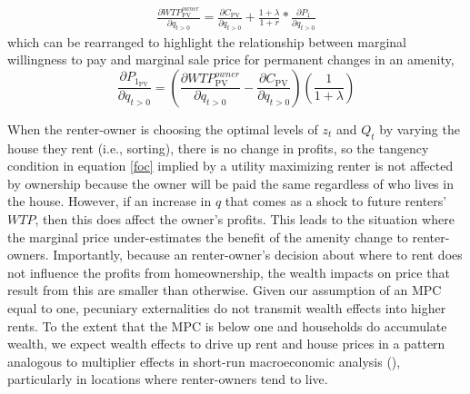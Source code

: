 \documentclass[ecta,nameyear,draft]{econsocart}
\theoremstyle{plain}
\theoremstyle{remark}
\begin{document}
\begin{eqnarray*}
	\frac{\partial \mathit{WTP}^{\mathit{owner}}_{\mathrm{PV}}}{\partial q_{t>0}} =	\frac{\partial C_{\mathrm{PV}}}{\partial q_{t>0}}+\frac{1+\lambda}{1+r}*\frac{\partial P_1}{\partial q_{t>0}}
\end{eqnarray*}
which can be rearranged to highlight the relationship between marginal willingness to pay and marginal sale price for permanent changes in an amenity,
\begin{equation*}
	\frac{\partial P_{1_{\mathrm{PV}}}} {\partial q_{t>0}}=\left(
	\frac{\partial \mathit{WTP}^{\mathit{owner}}_{\mathrm{PV}}}{\partial q_{t>0}}-\frac{\partial C_{\mathrm{PV}}}{\partial q_{t>0}}\right)\left(\frac{1}{1+\lambda}\right)
\end{equation*}


When the renter-owner is choosing the optimal levels of $z_t$ and $Q_t$ by varying the house they rent (i.e., sorting), there is no change in profits, so the tangency condition in equation \ref{foc} implied by a utility maximizing renter is not affected by ownership because the owner will be paid the same regardless of who lives in the house. However, if an increase in $q$ that comes as a shock to future renters' $WTP$, then this does affect the owner's profits. This leads to the situation where the marginal price under-estimates the benefit of the amenity change to renter-owners. Importantly, because an renter-owner's decision about where to rent does not influence the profits from homeownership, the wealth impacts on price that result from this are smaller than otherwise. Given our assumption of an MPC equal to one, pecuniary externalities do not transmit wealth effects into higher rents. To the extent that the MPC is below one and households do accumulate wealth, we expect wealth effects to drive up rent and house prices in a pattern analogous to multiplier effects in short-run macroeconomic analysis (\cite{samuelson39}), particularly in locations where renter-owners tend to live.
\end{document}

